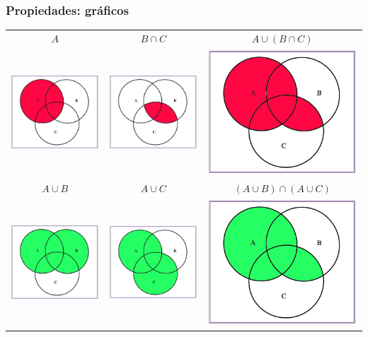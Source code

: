 \documentclass[handout]{beamer}\usepackage[]{graphicx}\usepackage[]{color}
\theoremstyle{plain}
\theoremstyle{definition}
\begin{document}
\begin{frame}
\frametitle{Propiedades: gráficos}

\begin{center}
\begin{tabular}{ccc}
\hspace*{-1.5cm}  $A$ & $B\cap C$ & $A\cup (B\cap C)$\\
\hspace*{-1.5cm} \includegraphics[width=0.25\linewidth]{distr11.jpg} &
\includegraphics[width=0.25\linewidth]{distr12.jpg} &
\includegraphics[width=0.25\linewidth]{distr13.jpg}\\[2ex]
\hspace*{-1.5cm} $A\cup B$ & $A\cup C$ & $(A\cup B)\cap (A\cup C)$\\
\hspace*{-1.5cm}\includegraphics[width=0.3\linewidth]{distr21.jpg} &
\includegraphics[width=0.25\linewidth]{distr22.jpg} &
\includegraphics[width=0.25\linewidth]{distr23.jpg}\\ 
\end{tabular}
\end{center}
\end{frame}
\end{document}
